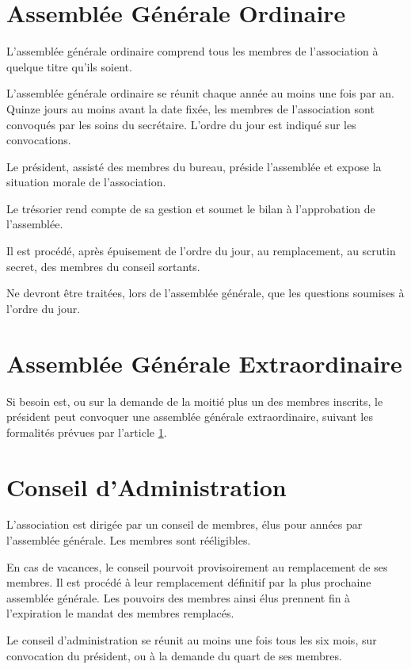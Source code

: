 \documentclass[12pt]{constitution}
\begin{document}
	
	\section{Assemblée Générale Ordinaire}
	\label{AGO}
	L'assemblée générale ordinaire comprend tous les membres de l'association à quelque titre qu'ils soient.
	
	\medskip
	L’assemblée générale ordinaire se réunit chaque année au moins une fois par an. Quinze jours au moins avant la date fixée, les membres de l’association sont convoqués par les soins du secrétaire. L’ordre du jour est indiqué sur les convocations.
	
	\medskip
	Le président, assisté des membres du bureau, préside l'assemblée et expose la situation morale de l’association.
	
	Le trésorier rend compte de sa gestion et soumet le bilan à l’approbation de l’assemblée.
	
	Il est procédé, après épuisement de l’ordre du jour, au remplacement, au scrutin secret, des membres du conseil sortants.
	
	\medskip
	Ne devront être traitées, lors de l’assemblée générale, que les questions soumises à l’ordre du jour.
	
	\section{Assemblée Générale Extraordinaire}
	Si besoin est, ou sur la demande de la moitié plus un des membres inscrits, le président peut convoquer une assemblée générale extraordinaire, suivant les formalités prévues par l’article \ref{AGO}.
	
	\section{Conseil d'Administration}
	L'association est dirigée par un conseil de \tailleCA membres, 
	élus
	 pour \dureeMandatCA années par l'assemblée générale. Les membres sont rééligibles.
	
	En cas de vacances, le conseil pourvoit provisoirement au remplacement de ses membres. Il est procédé à leur remplacement définitif par la plus prochaine assemblée générale. Les pouvoirs des membres ainsi élus prennent fin à l'expiration le mandat des membres remplacés.
	
	\medskip
	Le conseil d'administration se réunit au moins une fois tous les six mois, sur convocation du président, ou à la demande du quart de ses membres.
	
\end{document}
